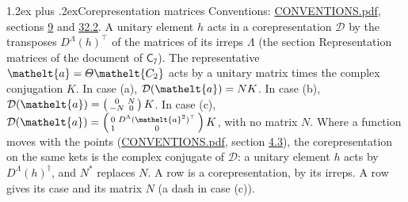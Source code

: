 \documentclass[10pt,a4paper]{article}
\makeatletter
\renewcommand\section{\@startsection{section}{1}{\z@}{-3ex plus -1ex minus -.2ex}%
  {1.2ex plus .2ex}{\normalfont\large\sffamily\bfseries\color{parttitle}}}
\numberwithin{equation}{section}
\newcommand{\eltfont}[1]{{\let\sigma\eltsigma\mathelt{#1}}}
\newcommand{\grp}[1]{\mathsf{#1}}
\newcommand{\elt}[1]{\eltfont{#1}}
\makeatother
\begin{document}
\section{Corepresentation matrices}\label{s:corep_matrices}
Conventions: \href{../../CONVENTIONS.pdf}{CONVENTIONS.pdf}, sections \href{../../../rotation/CONVENTIONS.pdf\#conv.9}{9} and \href{../../CONVENTIONS.pdf\#conv.32.2}{32.2}.
A unitary element $h$ acts in a corepresentation $\mathcal{D}$ by the transposes $D^{\Lambda}(h)^{\top}$ of the matrices of its irreps $\Lambda$ (the section Representation matrices of the document of \href{../../../rotation/data/pdf/C7.pdf}{$\grp{C_{7}}$}). The representative $\elt{a} = \varTheta\elt{C_{2}}$ acts by a unitary matrix times the complex conjugation $K$.
In case (a), $\mathcal{D}(\elt{a}) = NK$. In case (b), $\mathcal{D}(\elt{a}) = \left(\begin{smallmatrix} 0 & N \\ -N & 0 \end{smallmatrix}\right) K$. In case (c), $\mathcal{D}(\elt{a}) = \left(\begin{smallmatrix} 0 & D^{\Lambda}(\elt{a}^2)^{\top} \\ 1 & 0 \end{smallmatrix}\right) K$, with no matrix $N$.
Where a function moves with the points (\href{../../CONVENTIONS.pdf}{CONVENTIONS.pdf}, section \href{../../../rotation/CONVENTIONS.pdf\#conv.4.3}{4.3}), the corepresentation on the same kets is the complex conjugate of $\mathcal{D}$: a unitary element $h$ acts by $D^{\Lambda}(h)^{\dagger}$, and $N^{*}$ replaces $N$.
A row is a corepresentation, by its irreps. A row gives its case and its matrix $N$ (a dash in case (c)).
\end{document}

